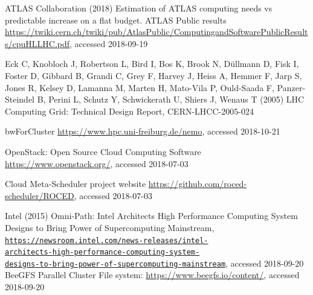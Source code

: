 
\begin{thebibliography}{}
%
%
  ATLAS Collaboration (2018) Estimation of ATLAS computing needs vs
  predictable increase on a flat budget. ATLAS Public results
  \url{https://twiki.cern.ch/twiki/pub/AtlasPublic/ComputingandSoftwarePublicResults/cpuHLLHC.pdf},
  accessed 2018-09-19

	Eck C, Knobloch J, Robertson L, Bird I, Bos K, Brook
  N, D\"ullmann D, Fisk I, Foster D, Gibbard B, Grandi C, Grey F, Harvey
  J, Heiss A, Hemmer F, Jarp S, Jones R, Kelsey D, Lamanna M, Marten
  H, Mato-Vila P, Ould-Saada F, Panzer-Steindel B, Perini L, Schutz Y,
  Schwickerath U, Shiers J, Wenaus T (2005) LHC Computing Grid: Technical Design Report, 
  CERN-LHCC-2005-024


 bwForCluster \NEMO \url{https://www.hpc.uni-freiburg.de/nemo}, accessed 2018-10-21
  
OpenStack: Open Source Cloud Computing Software
\url{https://www.openstack.org/}, accessed 2018-07-03

\Roced Cloud Meta-Scheduler project website
\url{https://github.com/roced-scheduler/ROCED}, accessed 2018-07-03

 Intel (2015) Omni-Path:
Intel Architects High Performance Computing System Designs to Bring
Power of Supercomputing Mainstream,
\texttt{\href{https://newsroom.intel.com/news-releases/intel-architects-high-performance-computing-system-designs-to-bring-power-of-supercomputing-mainstream/}{https://newsroom.intel.com/news-releases/intel-\\architects-high-performance-computing-system-\\designs-to-bring-power-of-supercomputing-mainstream}}, accessed 2018-09-20
BeeGFS Parallel Cluster File system:
\url{https://www.beegfs.io/content/}, accessed 2018-09-20


\end{thebibliography}
